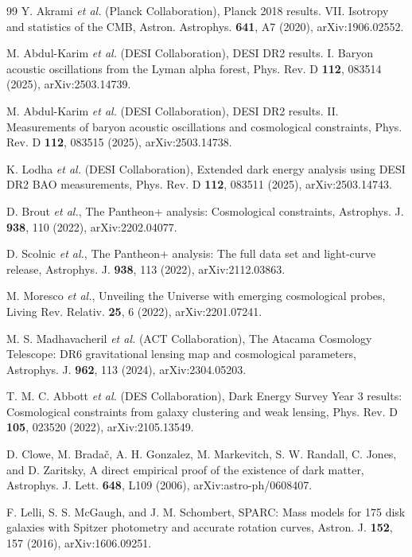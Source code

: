 \documentclass[
  aps,
  prd,
  reprint,
  superscriptaddress,
  nofootinbib,
  floatfix,
  longbibliography
]{revtex4-2}
\theoremstyle{plain}
\theoremstyle{definition}
\theoremstyle{remark}
\begin{document}
\begin{thebibliography}{99}
Y. Akrami \textit{et al.} (Planck Collaboration), Planck 2018 results. VII. Isotropy and
statistics of the CMB, Astron. Astrophys. \textbf{641}, A7 (2020), arXiv:1906.02552.

M. Abdul-Karim \textit{et al.} (DESI Collaboration), DESI DR2 results. I. Baryon acoustic
oscillations from the Lyman alpha forest, Phys. Rev. D \textbf{112}, 083514 (2025),
arXiv:2503.14739.

M. Abdul-Karim \textit{et al.} (DESI Collaboration), DESI DR2 results. II. Measurements of
baryon acoustic oscillations and cosmological constraints, Phys. Rev. D \textbf{112},
083515 (2025), arXiv:2503.14738.

K. Lodha \textit{et al.} (DESI Collaboration), Extended dark energy analysis using DESI
DR2 BAO measurements, Phys. Rev. D \textbf{112}, 083511 (2025), arXiv:2503.14743.

D. Brout \textit{et al.}, The Pantheon+ analysis: Cosmological constraints,
Astrophys. J. \textbf{938}, 110 (2022), arXiv:2202.04077.

D. Scolnic \textit{et al.}, The Pantheon+ analysis: The full data set and light-curve
release, Astrophys. J. \textbf{938}, 113 (2022), arXiv:2112.03863.

M. Moresco \textit{et al.}, Unveiling the Universe with emerging cosmological probes,
Living Rev. Relativ. \textbf{25}, 6 (2022), arXiv:2201.07241.

M. S. Madhavacheril \textit{et al.} (ACT Collaboration), The Atacama Cosmology Telescope:
DR6 gravitational lensing map and cosmological parameters, Astrophys. J. \textbf{962},
113 (2024), arXiv:2304.05203.

T. M. C. Abbott \textit{et al.} (DES Collaboration), Dark Energy Survey Year 3 results:
Cosmological constraints from galaxy clustering and weak lensing, Phys. Rev. D
\textbf{105}, 023520 (2022), arXiv:2105.13549.

D. Clowe, M. Brada\v{c}, A. H. Gonzalez, M. Markevitch, S. W. Randall, C. Jones, and
D. Zaritsky, A direct empirical proof of the existence of dark matter, Astrophys. J. Lett.
\textbf{648}, L109 (2006), arXiv:astro-ph/0608407.

F. Lelli, S. S. McGaugh, and J. M. Schombert, SPARC: Mass models for 175 disk galaxies
with Spitzer photometry and accurate rotation curves, Astron. J. \textbf{152}, 157
(2016), arXiv:1606.09251.


\end{thebibliography}
\end{document}

